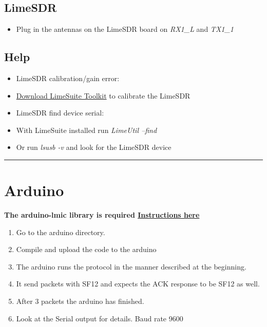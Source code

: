\subsection{LimeSDR}\label{limesdr}

\begin{itemize}
\tightlist
\item
  Plug in the antennas on the LimeSDR board on \emph{RX1\_L} and
  \emph{TX1\_1}
\end{itemize}

\subsection{Help}\label{help}

\begin{itemize}
\item
  LimeSDR calibration/gain error:
\item
  \href{https://wiki.myriadrf.org/Lime_Suite}{Download LimeSuite
  Toolkit} to calibrate the LimeSDR
\item
  LimeSDR find device serial:
\item
  With LimeSuite installed run \emph{LimeUtil --find}
\item
  Or run \emph{lsusb -v} and look for the LimeSDR device
\end{itemize}

\begin{center}\rule{0.5\linewidth}{\linethickness}\end{center}

\section{Arduino}\label{arduino}

\textbf{The arduino-lmic library is required
\href{https://github.com/matthijskooijman/arduino-lmic}{Instructions
here}}

\begin{enumerate}
\def\labelenumi{\arabic{enumi}.}
\tightlist
\item
  Go to the arduino directory.
\item
  Compile and upload the code to the arduino
\item
  The arduino runs the protocol in the manner described at the
  beginning.
\item
  It send packets with SF12 and expects the ACK response to be SF12 as
  well.
\item
  After 3 packets the arduino has finished.
\item
  Look at the Serial output for details. Baud rate 9600
\end{enumerate}

